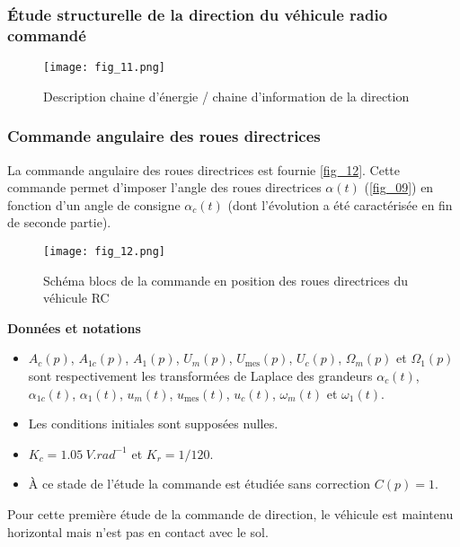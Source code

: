 \subsubsection{Étude structurelle de la direction du véhicule radio commandé}
\ifprof
\begin{corrige}
\end{corrige}
\else
\fi

\begin{figure}[H]
\centering
\texttt{[image: fig\_11.png]}
\caption{Description chaine d’énergie / chaine d’information de la direction \label{fig_11}}
\end{figure}

\subsubsection{Commande angulaire des roues directrices}
La commande angulaire des roues directrices est fournie \autoref{fig_12}. Cette commande permet d’imposer l’angle des roues directrices $\alpha(t)$ (\autoref{fig_09}) en fonction d’un angle de consigne $\alpha_c(t)$ (dont l’évolution a été caractérisée en fin de seconde partie).


\begin{figure}[H]
\centering
\texttt{[image: fig\_12.png]}
\caption{Schéma blocs de la commande en position des roues directrices du véhicule RC \label{fig_12}}
\end{figure}

\textbf{Données et notations}
\begin{itemize}
\item $A_{c}(p)$, $A_{1c}(p)$, $A_{1}(p)$, $U_m(p)$, $U_{\text{mes}}(p)$, $U_c(p)$, $\Omega_m(p)$ et 
$\Omega_1(p)$ sont respectivement les transformées de Laplace des grandeurs 
$\alpha_{c}(t)$, $\alpha_{1c}(t)$, $\alpha_{1}(t)$, $u_m(t)$, $u_{\text{mes}}(t)$, $u_c(t)$, $\omega_m(t)$ et $\omega_1(t)$.
\item Les conditions initiales sont supposées nulles.
\item $K_c = \SI{1,05}{V.rad^{-1}}$ et $K_r=1/120$.
\item À ce stade de l’étude la commande est étudiée sans correction $C(p)=1$.
\end{itemize}
Pour cette première étude de la commande de direction, le véhicule est maintenu horizontal mais n’est pas en
contact avec le sol.

